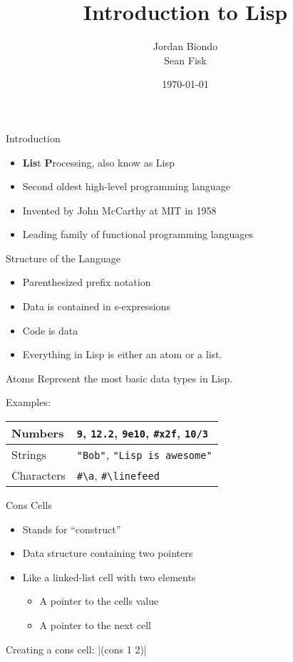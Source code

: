 \documentclass{beamer}
\title[Lisp Introduction]{Introduction to Lisp}
\author{Jordan Biondo \\ Sean Fisk}
\institute{Grand Valley State University}
\date{\today}
\begin{document}
\begin{frame}
\titlepage
\end{frame}


\begin{frame}{Introduction}
  \begin{itemize}
  \item \textbf{Lis}t \textbf{P}rocessing, also know as Lisp
  \item Second oldest high-level programming language
  \item Invented by John McCarthy at MIT in 1958
  \item Leading family of functional programming languages
  \end{itemize}
\end{frame}

\begin{frame}{Structure of the Language}
\begin{itemize}
\item Parenthesized prefix notation
\item Data is contained in s-expressions
\item Code is data
\item Everything in Lisp is either an atom or a list.
\end{itemize}

\end{frame}

\begin{frame}{Atoms}
Represent the most basic data types in Lisp.

Examples:

\begin{tabu}{| X | X |}
  \hline
  Numbers & \texttt{9}, \texttt{12.2}, \texttt{9e10}, \texttt{\#x2f}, \texttt{10/3} \\ \hline
  Strings & \texttt{"Bob"}, \texttt{"Lisp is awesome"} \\ \hline
  Characters & \texttt{\#\textbackslash{}a}, \texttt{\#\textbackslash{}linefeed} \\ \hline
\end{tabu}
\end{frame}

\begin{frame}{Cons Cells}
\begin{itemize}
\item Stands for ``construct''
\item Data structure containing two pointers
\item Like a linked-list cell with two elements
  \begin{itemize}
  \item A pointer to the cells value
  \item A pointer to the next cell
  \end{itemize}
\end{itemize}

Creating a cons cell: \cl|(cons 1 2)|
\end{frame}
\end{document}
